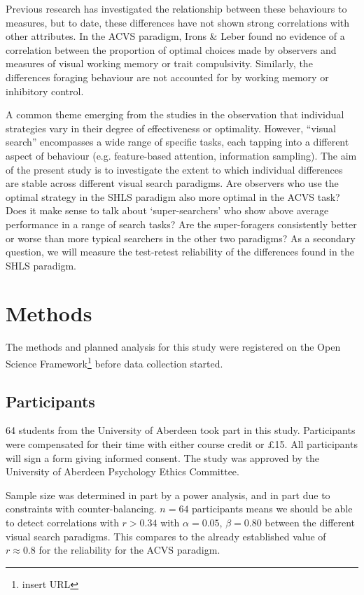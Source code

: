 \documentclass[]{rsos}%
\begin{document}
Previous research has investigated the relationship between these behaviours to  measures, but to date, these differences have not shown strong correlations with other attributes. In the ACVS paradigm, Irons \& Leber found no evidence of a correlation between the proportion of optimal choices made by observers and measures of visual working memory or trait compulsivity\cite{irons-leber2016}. Similarly, the differences foraging behaviour are not accounted for by working memory or inhibitory control\cite{johannesson2017}. 

A common theme emerging from the studies in the observation that individual strategies vary in their degree of effectiveness or optimality. However, ``visual search'' encompasses a wide range of specific tasks, each tapping into a different aspect of behaviour (e.g. feature-based attention, information sampling). The aim of the present study is to investigate the extent to which individual differences are stable across different visual search paradigms. Are observers who use the optimal strategy in the SHLS paradigm also more optimal in the ACVS task? Does it make sense to talk about `super-searchers' who show above average performance in a range of search tasks? Are the super-foragers consistently better or worse than more typical searchers in the other two paradigms? As a secondary question, we will measure the test-retest reliability of the differences found in the SHLS paradigm. 

\section{Methods}

The methods and planned analysis for this study were registered on the Open Science Framework\footnote{insert URL} before data collection started.

\subsection{Participants}
64 students from the University of Aberdeen took part in this study. Participants were compensated for their time with either  course credit or \pounds 15. All participants will sign a form giving informed consent. The study was approved by the University of Aberdeen Psychology Ethics Committee. 

Sample size was determined in part by a power analysis, and in part due to constraints with counter-balancing. $n = 64$ participants means we should be able to detect correlations with $r > 0.34$ with $\alpha = 0.05$, $\beta = 0.80$ between the different visual search paradigms. This compares to the already established value of $r \approx 0.8$ for the reliability for the ACVS paradigm. 
\end{document}
